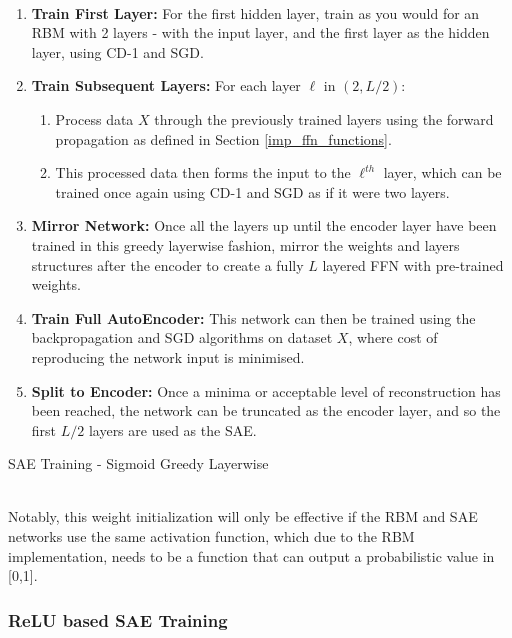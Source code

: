 \documentclass[a4paper,11pt,oneside]{article}
\theoremstyle{plain}
\theoremstyle{definition}
\begin{document}
	\begin{algorithm}[H]
		\texttt{\\}
		
		\begin{enumerate}
		\item \textbf{Train First Layer:} For the first hidden layer, train as you would for an RBM with 2 layers - with the input layer, and the first layer as the hidden layer, using CD-1 and SGD.
		\item \textbf{Train Subsequent Layers:} For each layer $\ell$ in $(2, L/2)$:
		\begin{enumerate}
			\item Process data $X$ through the previously trained layers using the forward propagation as defined in Section \ref{imp_ffn_functions}.
			\item This processed data then forms the input to the $\ell^{th}$ layer, which can be trained once again using CD-1 and SGD as if it were two layers.
		\end{enumerate}
		\item \textbf{Mirror Network:} Once all the layers up until the encoder layer have been trained in this greedy layerwise fashion, mirror the weights and layers structures after the encoder to create a fully $L$ layered FFN with pre-trained weights.
		\item \textbf{Train Full AutoEncoder:} This network can then be trained using the backpropagation and SGD algorithms on dataset $X$, where cost of reproducing the network input is minimised.
		\item \textbf{Split to Encoder:} Once a minima or acceptable level of reconstruction has been reached, the network can be truncated as the encoder layer, and so the first $L/2$ layers are used as the SAE.
	\end{enumerate}
		
		\label{algo_sae_rbm}
		\caption{SAE Training - Sigmoid Greedy Layerwise}
	\end{algorithm}
	~\\
	 Notably, this weight initialization will only be effective if the RBM and SAE networks use the same activation function, which due to the RBM implementation, needs to be a function that can output a probabilistic value in [0,1].
	
	\subsubsection{ReLU based SAE Training}\label{imp_relusae}
	
\end{document}
